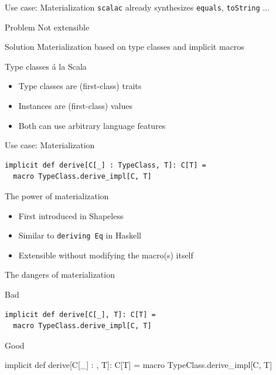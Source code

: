 \documentclass{beamer}
\begin{document}
\begin{frame}{Use case: Materialization}
  \texttt{scalac} already synthesizes \texttt{equals}, \texttt{toString} ...

  \vspace{1em}
  \begin{alertblock}{Problem}
    Not extensible
  \end{alertblock}

  \vspace{1em}
  \begin{exampleblock}{Solution}
    Materialization based on type classes and implicit macros
  \end{exampleblock}
\end{frame}

\begin{frame}{Type classes \'a la Scala}
  \begin{itemize}
    \item Type classes are (first-class) traits
    \item Instances are (first-class) values
    \item<visible@2> Both can use arbitrary language features
  \end{itemize}
\end{frame}

\begin{frame}[fragile]{Use case: Materialization}
  \begin{verbatim}
implicit def derive[C[_] : TypeClass, T]: C[T] =
  macro TypeClass.derive_impl[C, T]
  \end{verbatim}
\end{frame}

\begin{frame}{The power of materialization}
  \begin{itemize}
    \item First introduced in Shapeless
    \item Similar to \texttt{deriving Eq} in Haskell
    \item Extensible without modifying the macro(s) itself
  \end{itemize}
\end{frame}

\begin{frame}[fragile]{The dangers of materialization}
  \vspace{1em}
  \begin{alertblock}{Bad}
  \begin{verbatim}
implicit def derive[C[_], T]: C[T] =
  macro TypeClass.derive_impl[C, T]
  \end{verbatim}
  \end{alertblock}

  \vspace{1em}
  \begin{exampleblock}{Good}
  \begin{semiverbatim}
implicit def derive[C[_] : \text{\color{blue}{TypeClass}}, T]: C[T] =
  macro TypeClass.derive_impl[C, T]
  \end{semiverbatim}
  \end{exampleblock}
\end{frame}
\end{document}
